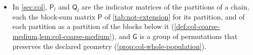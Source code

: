 \begin{itemize}
\item In \cref{sec:col}, $\mathsf P_l$ and $\mathsf Q_l$ are the indicator matrices of the partitions of a chain, each the block-sum matrix $\mathsf P$ of \cref{tab:not-extension} for its partition, and of each partition as a partition of the blocks below it (\cref{def:col-coarse-medium,lem:col-coarse-medium}), and $\mathsf G$ is a group of permutations that preserves the declared geometry (\cref{prop:col-whole-population}).
\end{itemize}
